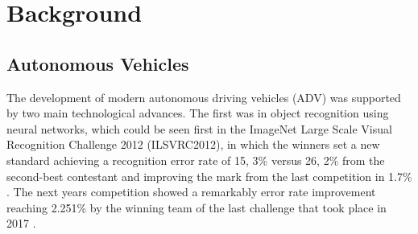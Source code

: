 \chapter{Background} \label{background}
\vspace{-1.9cm}




\section{Autonomous Vehicles} 
\label{sec:autonomous-vehicles}

The development of modern autonomous driving vehicles (ADV) was supported by two main technological advances. The first was in object recognition using neural networks, which could be seen first in the ImageNet Large Scale Visual Recognition Challenge 2012 (ILSVRC2012), in which the winners set a new standard achieving a recognition error rate of 15, 3\% versus 26, 2\% from the second-best contestant and improving the mark from the last competition in 1.7\% \cite{Krizhevsky2017}. The next years competition showed a remarkably error rate improvement reaching 2.251\% by the winning team of the last challenge that took place in 2017 \cite{hu2018}.


